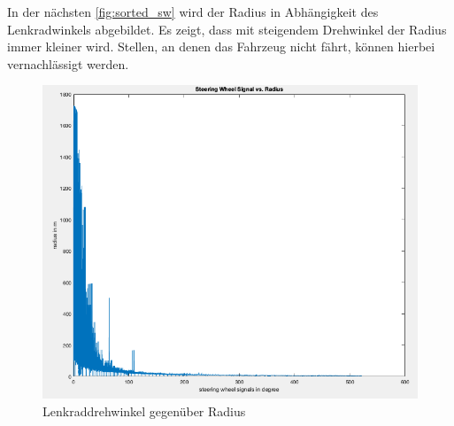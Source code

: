 	In der nächsten \autoref{fig:sorted_sw} wird der Radius in Abhängigkeit des Lenkradwinkels abgebildet. Es zeigt, dass mit steigendem Drehwinkel der Radius immer kleiner wird. Stellen, an denen das Fahrzeug nicht fährt, können hierbei vernachlässigt werden. 
	
		\begin{figure}[h!]
		\centering
		\includegraphics[width=1\linewidth]{../Graphiken/sorted_sw}
		\caption{Lenkraddrehwinkel gegenüber Radius}
		\label{fig:sorted_sw}
	\end{figure}
\pagebreak

